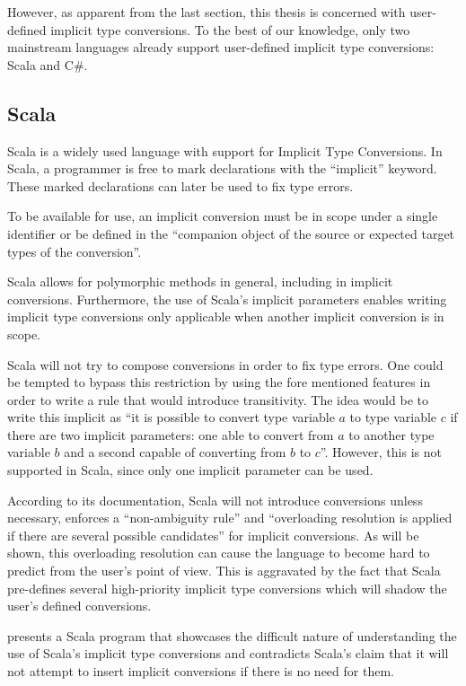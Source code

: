 However, as apparent from the last section, this thesis is concerned with user-defined implicit type conversions. To the best of our knowledge, only two mainstream languages already support user-defined implicit type conversions: Scala and C\#.
\subsection{Scala}
\label{scala}

Scala \cite{scala} is a widely used language with support for Implicit Type Conversions. In Scala, a programmer is free to mark declarations with the ``implicit'' keyword. These marked declarations can later be used to fix type errors.

To be available for use, an implicit conversion must be in scope under a single identifier or be defined in the ``companion object of  the source or expected target types of the conversion''.

Scala allows for polymorphic methods in general, including in implicit conversions. Furthermore, the use of Scala's implicit parameters enables writing implicit type conversions only applicable when another implicit conversion is in scope. 

Scala will not try to compose conversions in order to fix type errors. One could be tempted to bypass this restriction by using the fore mentioned features in order to write a rule that would introduce transitivity. The idea would be to write this implicit as ``it is possible to convert type variable $a$ to type variable $c$ if there are two implicit parameters: one able to convert from $a$ to another type variable $b$ and a second capable of converting from $b$ to $c$''. However, this is not supported in Scala, since only one implicit parameter can be used.

According to its documentation, Scala will not introduce conversions unless necessary, enforces a ``non-ambiguity rule'' and ``overloading resolution is applied if there are several possible candidates'' for implicit conversions. As will be shown, this overloading resolution can cause the language to become hard to predict from the user's point of view. This is aggravated by the fact that Scala pre-defines several high-priority implicit type conversions which will shadow the user's defined conversions.

 presents a Scala program that showcases the difficult nature of understanding the use of Scala's implicit type conversions and contradicts Scala's claim that it will not attempt to insert implicit conversions if there is no need for them.

